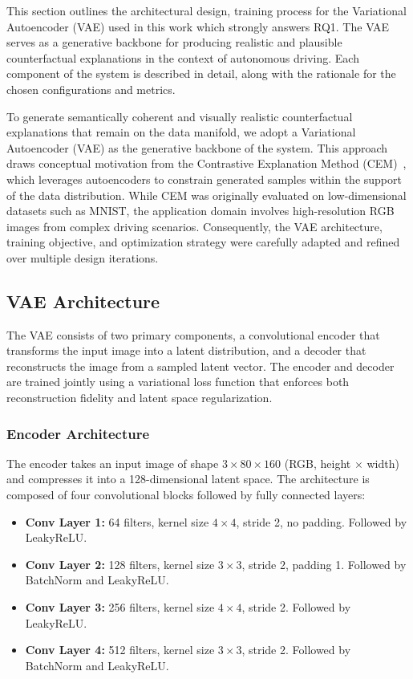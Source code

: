 This section outlines the architectural design, training process for the Variational Autoencoder (VAE) used in this work which strongly answers RQ1. The VAE serves as a generative backbone for producing realistic and plausible counterfactual explanations in the context of autonomous driving. Each component of the system is described in detail, along with the rationale for the chosen configurations and metrics.

To generate semantically coherent and visually realistic counterfactual explanations that remain on the data manifold, we adopt a Variational Autoencoder (VAE) as the generative backbone of the system. This approach draws conceptual motivation from the Contrastive Explanation Method (CEM)~\cite{DBLP:journals/corr/abs-1802-07623}, which leverages autoencoders to constrain generated samples within the support of the data distribution. While CEM was originally evaluated on low-dimensional datasets such as MNIST, the application domain involves high-resolution RGB images from complex driving scenarios. Consequently, the VAE architecture, training objective, and optimization strategy were carefully adapted and refined over multiple design iterations.

\subsection{VAE Architecture} \label{sec:vae_architecture}

The VAE consists of two primary components, a convolutional encoder that transforms the input image into a latent distribution, and a decoder that reconstructs the image from a sampled latent vector. The encoder and decoder are trained jointly using a variational loss function that enforces both reconstruction fidelity and latent space regularization.

\subsubsection{Encoder Architecture} \label{subsubsec:vae_encoder}

The encoder takes an input image of shape $3 \times 80 \times 160$ (RGB, height $\times$ width) and compresses it into a 128-dimensional latent space. The architecture is composed of four convolutional blocks followed by fully connected layers:

\begin{itemize}
    \item \textbf{Conv Layer 1:} 64 filters, kernel size $4 \times 4$, stride 2, no padding. Followed by LeakyReLU.
    \item \textbf{Conv Layer 2:} 128 filters, kernel size $3 \times 3$, stride 2, padding 1. Followed by BatchNorm and LeakyReLU.
    \item \textbf{Conv Layer 3:} 256 filters, kernel size $4 \times 4$, stride 2. Followed by LeakyReLU.
    \item \textbf{Conv Layer 4:} 512 filters, kernel size $3 \times 3$, stride 2. Followed by BatchNorm and LeakyReLU.
\end{itemize}

